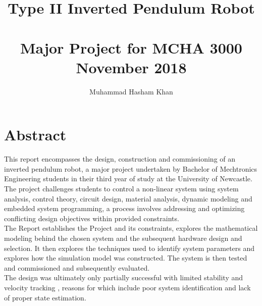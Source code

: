 \documentclass{UoNMCHA}
\numberwithin{equation}{section}
\begin{document}
\title{Type II Inverted Pendulum Robot \\ \ \\
{\small Major Project for MCHA 3000  \\November 2018}}
\author[UoNMCHA]{Muhammad Hasham Khan}
\address[UoNMCHA]{
Student of Mechatronics Engineering,\\
The University of Newcastle, Callaghan, NSW 2308, AUSTRALIA \\
Student Number: 3256011 \\
E-mail: \href{mailto:c3256011@uon.edu.au}{\textsf{c3256011@uon.edu.au}}}
\maketitle
\onecolumn

\vspace{-5mm}
\section*{Abstract}
\vspace{-3mm}
    
    This report encompasses the design, construction and commissioning of an inverted pendulum robot, a major project undertaken by Bachelor of Mechtronics Engineering students in their third year of study at the University of Newcastle. The project challenges students to control a non-linear system using system analysis, control theory, circuit design, material analysis, dynamic modeling and embedded system programming, a process involves addressing and optimizing conflicting design objectives within provided constraints. \\
    
    The Report establishes the Project and its constraints, explores the mathematical modeling behind the chosen system and the subsequent hardware design and selection. It then explores the techniques used to identify system parameters and explores how the simulation model was constructed. The system is then tested and commissioned and subsequently evaluated. \\
     
    The design was ultimately only partially successful with limited stability and velocity tracking ,  reasons for which include poor system identification and lack of proper state estimation. 
    

\newpage
\tableofcontents
\newpage
\end{document}
